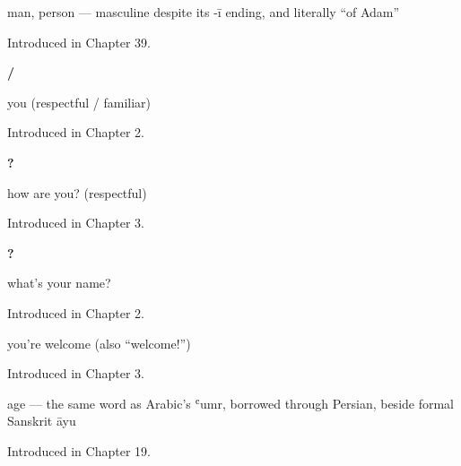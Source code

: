 \noindent\begin{minipage}[t]{\linewidth}
\raggedright
\textbf{}\par
\small man, person — masculine despite its -ī ending, and literally \textquotedblleft{}of Adam\textquotedblright{}\par
\footnotesize Introduced in Chapter 39.
\end{minipage}\par\medskip

\noindent\begin{minipage}[t]{\linewidth}
\raggedright
\textbf{ / }\par
\small you (respectful / familiar)\par
\footnotesize Introduced in Chapter 2.
\end{minipage}\par\medskip

\noindent\begin{minipage}[t]{\linewidth}
\raggedright
\textbf{  ?}\par
\small how are you? (respectful)\par
\footnotesize Introduced in Chapter 3.
\end{minipage}\par\medskip

\noindent\begin{minipage}[t]{\linewidth}
\raggedright
\textbf{   ?}\par
\small what's your name?\par
\footnotesize Introduced in Chapter 2.
\end{minipage}\par\medskip

\noindent\begin{minipage}[t]{\linewidth}
\raggedright
\textbf{  }\par
\small you're welcome (also \textquotedblleft{}welcome!\textquotedblright{})\par
\footnotesize Introduced in Chapter 3.
\end{minipage}\par\medskip

\noindent\begin{minipage}[t]{\linewidth}
\raggedright
\textbf{}\par
\small age — the same word as Arabic's ʿumr, borrowed through Persian, beside formal Sanskrit āyu\par
\footnotesize Introduced in Chapter 19.
\end{minipage}\par\medskip


